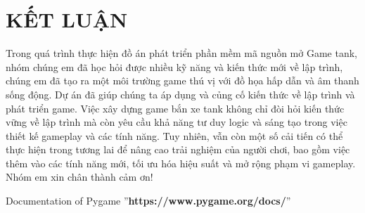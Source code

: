 \documentclass[a4paper]{article}
\begin{document}
	\section{KẾT LUẬN}
	
	Trong quá trình thực hiện đồ án phát triển phần mềm mã nguồn mở Game tank, nhóm chúng em đã học hỏi được nhiều kỹ năng và kiến thức mới về lập trình, chúng em đã tạo ra một môi trường game thú vị với đồ họa hấp dẫn và âm thanh sống động. Dự án đã giúp chúng ta áp dụng và củng cố kiến thức về lập trình và phát triển game. Việc xây dựng game bắn xe tank không chỉ đòi hỏi kiến thức vững về lập trình mà còn yêu cầu khả năng tư duy logic và sáng tạo trong việc thiết kế gameplay và các tính năng. Tuy nhiên, vẫn còn một số cải tiến có thể thực hiện trong tương lai để nâng cao trải nghiệm của người chơi, bao gồm việc thêm vào các tính năng mới, tối ưu hóa hiệu suất và mở rộng phạm vi gameplay. Nhóm em xin chân thành cảm ơn!

\newpage
\begin{thebibliography}{80}


Documentation of Pygame ''\textbf{https://www.pygame.org/docs/}''


\end{thebibliography}
\end{document}
